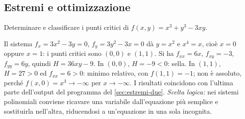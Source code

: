\subsection*{Estremi e ottimizzazione}

\begin{esercizio}
Determinare e classificare i punti critici di $f(x,y)=x^{3}+y^{3}-3xy$.
\begin{soluzione}
Il sistema $f_{x}=3x^{2}-3y=0$, $f_{y}=3y^{2}-3x=0$ dà $y=x^{2}$ e $x^{4}=x$, cioè $x=0$ oppure
$x=1$: i punti critici sono $(0,0)$ e $(1,1)$. Si ha $f_{xx}=6x$, $f_{xy}=-3$, $f_{yy}=6y$,
quindi $H=36xy-9$. In $(0,0)$, $H=-9<0$: sella. In $(1,1)$, $H=27>0$ ed $f_{xx}=6>0$:
minimo relativo, con $f(1,1)=-1$; non è assoluto, perché $f(x,0)=x^{3}\to-\infty$ per
$x\to-\infty$. I risultati coincidono con l'ultima parte dell'output del programma del
\cref{sec:estremi-due}. \emph{Scelta logica:} nei sistemi polinomiali conviene ricavare
una variabile dall'equazione più semplice e sostituirla nell'altra, riducendosi a
un'equazione in una sola incognita.
\end{soluzione}
\end{esercizio}

